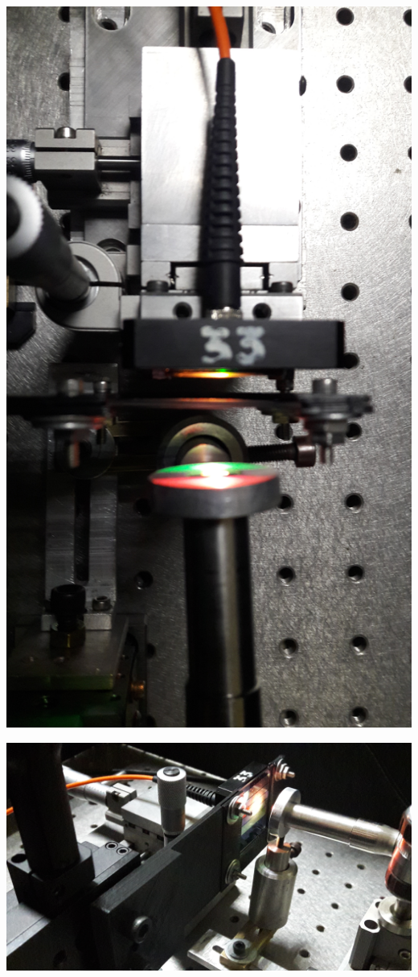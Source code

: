 \documentclass[12pt,dvipsnames]{exam}
\begin{document}
\begin{center}
	\includegraphics[scale=0.1]{imgs/setup_barrido/7.jpg}
\end{center}

\begin{center}
	\includegraphics[scale=0.1]{imgs/setup_barrido/8.jpg}
\end{center}
\end{document}
